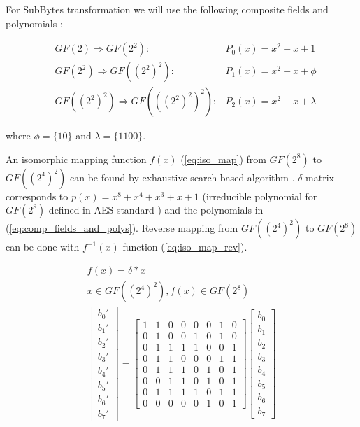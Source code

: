 For SubBytes transformation we will use the following composite fields and polynomials \cite{vlsi}:

\begin{equation}
\begin{aligned}
\label{eq:comp_fields_and_polys}
&GF(2) \Rightarrow GF(2^2) :               & P_0(x) = x^2 + x + 1\\
&GF(2^2) \Rightarrow GF((2^2)^2) :         & P_1(x) = x^2 + x + \phi\\
&GF((2^2)^2) \Rightarrow GF(((2^2)^2)^2) : & P_2(x) = x^2 + x + \lambda
\end{aligned}
\end{equation}

where $\phi = \{10\}$ and $\lambda = \{1100\}$.

An isomorphic mapping function $f(x)$ (\ref{eq:iso_map}) from $GF(2^8)$ to $GF((2^4)^2)$ can be found by exhaustive-search-based algorithm \cite{vlsi}. $\delta$ matrix corresponds to $p(x) = x^8 + x^4 + x^3 + x + 1$ (irreducible polynomial for $GF(2^8)$ defined in AES standard \cite{aes-standard}) and the polynomials in (\ref{eq:comp_fields_and_polys}). Reverse mapping from $GF((2^4)^2)$ to $GF(2^8)$ can be done with $f^{-1}(x)$ function (\ref{eq:iso_map_rev}).

\begin{equation}
\begin{gathered}
\label{eq:iso_map}
f(x) = \delta * x\\
x \in GF((2^4)^2), f(x) \in GF(2^8) \\
\begin{bmatrix}
b_0'\\b_1'\\b_2'\\b_3'\\b_4'\\b_5'\\b_6'\\b_7'
\end{bmatrix}
=
\begin{bmatrix}
    1 & 1 & 0 & 0 & 0 & 0 & 1 & 0 \\
    0 & 1 & 0 & 0 & 1 & 0 & 1 & 0 \\
    0 & 1 & 1 & 1 & 1 & 0 & 0 & 1 \\
    0 & 1 & 1 & 0 & 0 & 0 & 1 & 1 \\
    0 & 1 & 1 & 1 & 0 & 1 & 0 & 1 \\
    0 & 0 & 1 & 1 & 0 & 1 & 0 & 1 \\
    0 & 1 & 1 & 1 & 1 & 0 & 1 & 1 \\
    0 & 0 & 0 & 0 & 0 & 1 & 0 & 1
\end{bmatrix}
\begin{bmatrix}
b_0\\b_1\\b_2\\b_3\\b_4\\b_5\\b_6\\b_7
\end{bmatrix}
\end{gathered}
\end{equation}

